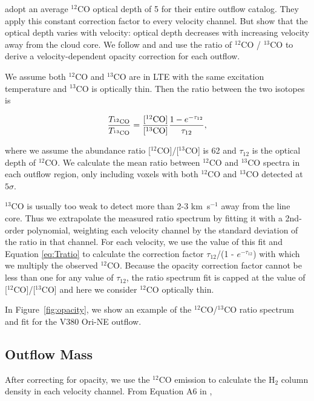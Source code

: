 \documentclass[twocolumn]{aastex62}
\newcommand{\example}{V380 Ori-NE}
\newcommand{\kms}{km~s$^{-1}$}
\newcommand{\co}[1][]{\ensuremath{^{#1}}CO}
\begin{document}
\citet{Tanabe:submitted} adopt an average \co[12]{} optical depth of 5 for their entire outflow catalog. They apply this constant correction factor to every velocity channel. But \citet{Dunham14} show that the optical depth varies with velocity: optical depth decreases with increasing velocity away from the cloud core. We follow \citet{Dunham14} and \citet{ZhangY16} and use the ratio of $^{12}$CO / $^{13}$CO to derive a velocity-dependent opacity correction for each outflow.

We assume both \co[12]{} and \co[13]{} are in LTE with the same excitation temperature and \co[13]{} is optically thin. Then the ratio between the two isotopes is

\begin{equation}\label{eq:Tratio}
\frac{T_{\rm \co[12]}}{T_{\rm \co[13]}} = \frac{[\rm{\co[12]}]}{[\rm{\co[13]}]} \frac{1 - e^{-\tau_{12}}}{\tau_{12}},
\end{equation}

where we assume the abundance ratio [\co[12]]/[\co[13]] is 62 \citep{Langer93} and $\tau_{12}$ is the optical depth of \co[12]{}. We calculate the mean ratio between \co[12]{} and \co[13]{} spectra in each outflow region, only including voxels with both \co[12]{} and \co[13]{} detected at $5\sigma$. 

\co[13]{} is usually too weak to detect more than 2-3 \kms{} away from the line core. Thus we extrapolate the measured ratio spectrum by fitting it with a 2nd-order polynomial, weighting each velocity channel by the standard deviation of the ratio in that channel. For each velocity, we use the value of this fit and Equation \ref{eq:Tratio} to calculate the correction factor $\tau_{12}$/(1 - $e^{-\tau_{12}}$) with which we multiply the observed \co[12]{}. Because the opacity correction factor cannot be less than one for any value of $\tau_{12}$, the ratio spectrum fit is capped at the value of [\co[12]]/[\co[13]] and here we consider \co[12]{} optically thin.

In Figure~\ref{fig:opacity}, we show an example of the \co[12]{}/\co[13]{} ratio spectrum and fit for the \example{} outflow. 

\subsection{Outflow Mass}
After correcting for opacity, we use the \co[12]{} emission to calculate the H$_2$ column density in each velocity channel. From Equation A6 in \citet{ZhangY16},
\end{document}
